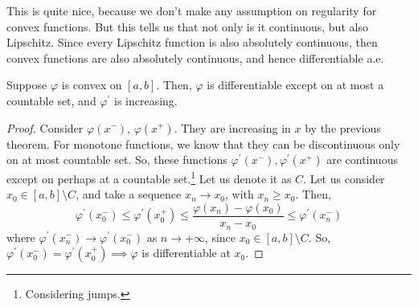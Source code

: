   This is quite nice, because we don't make any assumption on regularity for convex functions. But this tells us that not only is it continuous, but also Lipschitz. Since every Lipschitz function is also absolutely continuous, then convex functions are also absolutely continuous, and hence differentiable a.e.

  \begin{theorem}
    Suppose $\varphi$ is convex on $[a, b]$. Then, $\varphi$ is differentiable except on at most a countable set, and $\varphi^\prime$ is increasing. 
  \end{theorem}
  \begin{proof}
    Consider $\varphi(x^-)$, $\varphi (x^+)$. They are increasing in $x$ by the previous theorem. For monotone functions, we know that they can be discontinuous only on at most countable set.  So, these functions $\varphi^\prime (x^-), \varphi^\prime (x^+)$ are continuous except on perhaps at a countable set.\footnote{Considering jumps.} Let us denote it as $C$. Let us consider $x_0 \in [a, b] \setminus C$, and take a sequence $x_n \to x_0$, with $x_n \geq x_0$. Then, 
    \begin{equation}
      \varphi^\prime (x_0^-) \leq \varphi^\prime (x_0^+) \leq \frac{\varphi(x_n) - \varphi(x_0)}{x_n - x_0} \leq \varphi^\prime (x_n^-) 
    \end{equation}
    where $\varphi^\prime (x_n^-) \to \varphi^\prime (x_0^-)$ as $n \to +\infty$, since $x_0 \in [a, b] \setminus C$. So, $\varphi^\prime (x_0^-) = \varphi^\prime (x_0^+) \implies \varphi$ is differentiable at $x_0$. 
  \end{proof}

